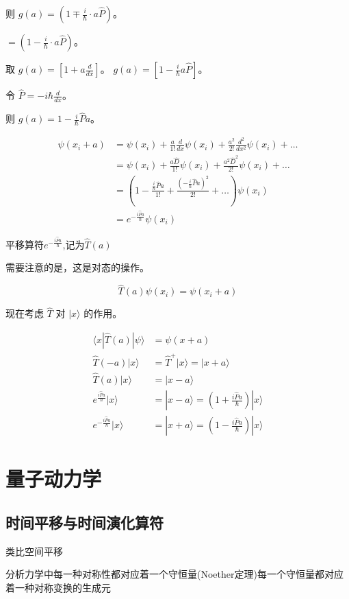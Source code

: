 \documentclass[lang=cn,10pt]{elegantbook}
\begin{document}
	则 $g(a) = (1 \mp \frac{i}{\hbar} \cdot a \hat{P})$。

	$= (1 - \frac{i}{\hbar} \cdot a \hat{P})$。

	取 $g(a) = [1 + a \frac{d}{dx}]$。
	$g(a) = [1 - \frac{i}{\hbar} a \hat{P}]$。

令 $\hat{P} = - i \hbar \frac{d}{dx}$。

	则 $g(a) = 1 - \frac{i}{\hbar} \hat{P} a$。

\begin{align*}
	\psi(x_i + a) & = \psi(x_i) + \frac{a}{1!} \frac{d}{dx} \psi(x_i) + \frac{a^2}{2!} \frac{d^2}{dx^2} \psi(x_i) + \ldots \\
	& = \psi(x_i) + \frac{a \hat{D}}{1!} \psi(x_i) + \frac{a^2 \hat{D}^2}{2!} \psi(x_i) + \ldots \\
		& = \left(1 - \frac{\frac{i}{\hbar}\hat{P} a}{1!} + \frac{(-\frac{i}{\hbar}\hat{P} a)^2}{2!} + \ldots \right) \psi(x_i) \\
		& = e^{-\frac{i \hat{P} a}{\hbar}} \psi(x_i)
\end{align*}

	平移算符$e^{-\frac{i \hat{P} a}{\hbar}}$,记为$\hat{T}(a)$

需要注意的是，这是对态的操作。

\[
	\hat{T}(a) \psi(x_i) = \psi(x_i + a)
\]

现在考虑 $\hat{T}$ 对 $|x\rangle$ 的作用。

\begin{align*}
	\langle x | \hat{T}(a) | \psi\rangle & = \psi(x+a) \\
	\hat{T}(-a) | x \rangle & = \hat{T}^+ | x \rangle = | x + a \rangle \\
	\hat{T}(a) | x \rangle & = | x - a \rangle \\
		e^{\frac{i \hat{P} a}{\hbar}} | x \rangle & = | x - a \rangle = \left( 1 + \frac{i \hat{P} a}{\hbar} \right) | x \rangle \\
		e^{-\frac{i \hat{P} a}{\hbar}} | x \rangle & = | x + a \rangle = \left( 1 - \frac{i \hat{P} a}{\hbar} \right) | x \rangle
\end{align*}
\chapter{量子动力学}
\section{时间平移与时间演化算符}
类比空间平移

分析力学中\quad 每一种对称性都对应着一个守恒量(Noether定理)每一个守恒量都对应着一种对称变换的生成元
\end{document}

